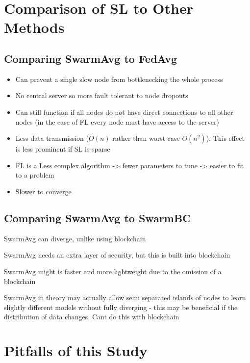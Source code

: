 \section{Comparison of SL to Other Methods}

\subsection{Comparing SwarmAvg to FedAvg}

\begin{itemize}
	\item Can prevent a single slow node from bottlenecking the whole process
	\item No central server so more fault tolerant to node dropouts
	\item Can still function if all nodes do not have direct connections to all other nodes (in the case of FL every node must have access to the server)
\end{itemize}


\begin{itemize}
	\item Less data transmission ($O(n)$ rather than worst case $O(n^2)$). This effect is less prominent if SL is sparse
	\item FL is a Less complex algorithm -> fewer parameters to tune -> easier to fit to a problem
	\item Slower to converge
\end{itemize}

\subsection{Comparing SwarmAvg to SwarmBC}

SwarmAvg can diverge, unlike using blockchain

SwarmAvg needs an extra layer of security, but this is built into blockchain

SwarmAvg might is faster and more lightweight due to the omission of a blockchain

SwarmAvg in theory may actually allow semi separated islands of nodes to learn slightly different models without fully diverging - this may be beneficial if the distribution of data changes. Cant do this with blockchain

\section{Pitfalls of this Study}


